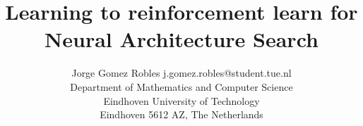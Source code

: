 \documentclass[twoside,11pt]{article}
\begin{document}
\title{Learning to reinforcement learn for Neural Architecture Search}

\author{\name Jorge Gomez Robles \email j.gomez.robles@student.tue.nl \\
       \addr Department of Mathematics and Computer Science\\
       Eindhoven University of Technology\\
       Eindhoven 5612 AZ, The Netherlands
}


\maketitle



% 







\vskip 0.2in


\newpage
\appendix


\end{document}
